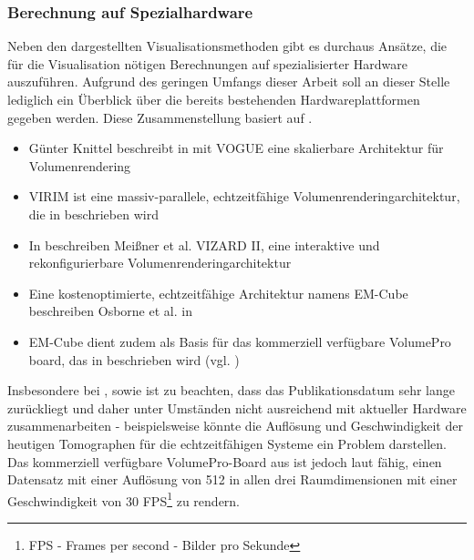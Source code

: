 \documentclass[pdftex,a4paper,titlepage,12pt]{scrartcl}
\newtheorem[L]{boxedDefinition}{Definition}
\begin{document}
\subsubsection{Berechnung auf Spezialhardware}\label{sssec:specialhardwarecalculation}
Neben den dargestellten Visualisationsmethoden gibt es durchaus Ansätze, die für die Visualisation nötigen Berechnungen auf spezialisierter Hardware auszuführen. Aufgrund des geringen Umfangs dieser Arbeit soll an dieser Stelle lediglich ein Überblick über die bereits bestehenden Hardwareplattformen gegeben werden. Diese Zusammenstellung basiert auf \cite[Kapitel 2.5.5, Seite 14]{Bruckner2004}.
\begin{itemize}
 \item Günter Knittel beschreibt in \cite{Knittel1995} mit VOGUE eine skalierbare Architektur für Volumenrendering
 \item VIRIM ist eine massiv-parallele, echtzeitfähige Volumenrenderingarchitektur, die in \cite{Guenther1995} beschrieben wird
 \item In \cite{Meissner2002} beschreiben Meißner et al. VIZARD II, eine interaktive und rekonfigurierbare Volumenrenderingarchitektur
 \item Eine kostenoptimierte, echtzeitfähige Architektur namens EM-Cube beschreiben Osborne et al. in \cite{Osborne1997}
 \item EM-Cube dient zudem als Basis für das kommerziell verfügbare VolumePro board, das in \cite{Pfister1999} beschrieben wird (vgl. \cite[Kapitel 2.2.5, Seite 14]{Bruckner2004})
\end{itemize}
Insbesondere bei \cite{Knittel1995}, \cite{Guenther1995} sowie \cite{Osborne1997} ist zu beachten, dass das Publikationsdatum sehr lange zurückliegt und daher unter Umständen nicht ausreichend mit aktueller Hardware zusammenarbeiten - beispielsweise könnte die Auflösung und Geschwindigkeit der heutigen Tomographen für die echtzeitfähigen Systeme ein Problem darstellen. Das kommerziell verfügbare VolumePro-Board aus \cite{Pfister1999} ist jedoch laut \cite[Kapitel 2.2.5, Seite 14]{Bruckner2004} fähig, einen Datensatz mit einer Auflösung von 512 in allen drei Raumdimensionen mit einer Geschwindigkeit von 30 FPS\footnote{FPS - Frames per second - Bilder pro Sekunde} zu rendern.
\end{document}
